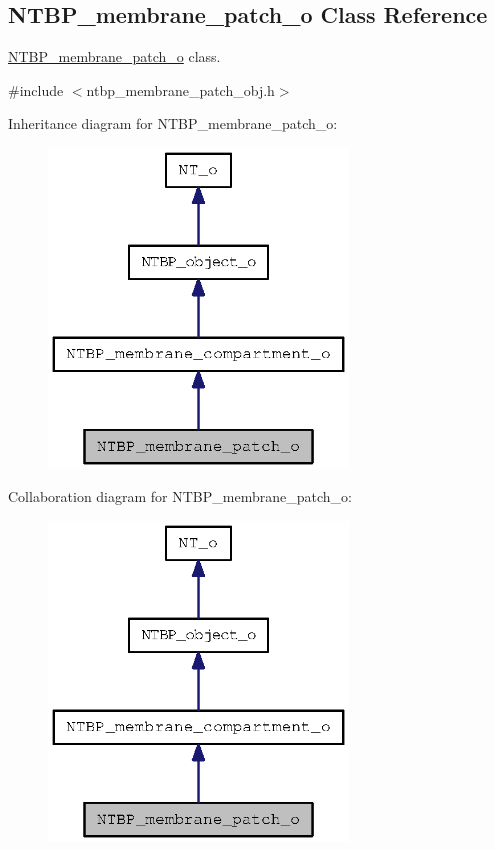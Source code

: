 \subsection{NTBP\_\-membrane\_\-patch\_\-o Class Reference}
\label{class_n_t_b_p__membrane__patch__o}


\hyperlink{class_n_t_b_p__membrane__patch__o}{NTBP\_\-membrane\_\-patch\_\-o} class.  




{\ttfamily \#include $<$ntbp\_\-membrane\_\-patch\_\-obj.h$>$}



Inheritance diagram for NTBP\_\-membrane\_\-patch\_\-o:
\nopagebreak
\begin{figure}[H]
\begin{center}
\leavevmode
\includegraphics[width=226pt]{class_n_t_b_p__membrane__patch__o__inherit__graph}
\end{center}
\end{figure}


Collaboration diagram for NTBP\_\-membrane\_\-patch\_\-o:
\nopagebreak
\begin{figure}[H]
\begin{center}
\leavevmode
\includegraphics[width=226pt]{class_n_t_b_p__membrane__patch__o__coll__graph}
\end{center}
\end{figure}
